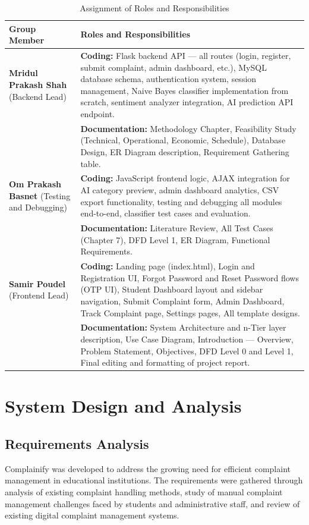 \documentclass[12pt,a4paper]{report}
\begin{document}
\begin{table}[H]
\centering
\caption{Assignment of Roles and Responsibilities}
\begin{tabular}{p{4cm}p{10cm}}
\toprule
\textbf{Group Member} & \textbf{Roles and Responsibilities} \\
\midrule
\textbf{Mridul Prakash Shah}
(Backend Lead) &
\textbf{Coding:} Flask backend API — all routes (login, register, submit complaint, admin dashboard, etc.), MySQL database schema, authentication system, session management, Naive Bayes classifier implementation from scratch, sentiment analyzer integration, AI prediction API endpoint. \\
& \textbf{Documentation:} Methodology Chapter, Feasibility Study (Technical, Operational, Economic, Schedule), Database Design, ER Diagram description, Requirement Gathering table. \\
\midrule
\textbf{Om Prakash Basnet}
(Testing and Debugging) &
\textbf{Coding:} JavaScript frontend logic, AJAX integration for AI category preview, admin dashboard analytics, CSV export functionality, testing and debugging all modules end-to-end, classifier test cases and evaluation. \\
& \textbf{Documentation:} Literature Review, All Test Cases (Chapter 7), DFD Level 1, ER Diagram, Functional Requirements. \\
\midrule
\textbf{Samir Poudel}
(Frontend Lead) &
\textbf{Coding:} Landing page (index.html), Login and Registration UI, Forgot Password and Reset Password flows (OTP UI), Student Dashboard layout and sidebar navigation, Submit Complaint form, Admin Dashboard, Track Complaint page, Settings pages, All template designs. \\
& \textbf{Documentation:} System Architecture and n-Tier layer description, Use Case Diagram, Introduction — Overview, Problem Statement, Objectives, DFD Level 0 and Level 1, Final editing and formatting of project report. \\
\bottomrule
\end{tabular}
\end{table}

\chapter{System Design and Analysis}

\section{Requirements Analysis}
Complainify was developed to address the growing need for efficient complaint management in educational institutions. The requirements were gathered through analysis of existing complaint handling methods, study of manual complaint management challenges faced by students and administrative staff, and review of existing digital complaint management systems.
\end{document}
